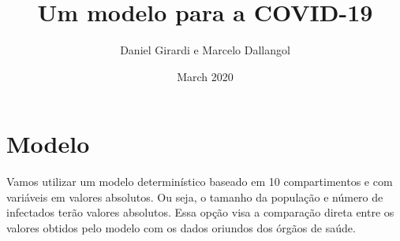 \documentclass{article}
\title{Um modelo para a COVID-19}
\author{Daniel Girardi e Marcelo Dallangol}
\date{March 2020}
\begin{document}
\maketitle

\section{Modelo}

Vamos utilizar um modelo determinístico baseado em 10 compartimentos e com variáveis em valores absolutos. Ou seja, o tamanho da população e número de infectados terão valores absolutos. Essa opção visa a comparação direta entre os valores obtidos pelo modelo com os dados oriundos dos órgãos de saúde. 



\end{document}
